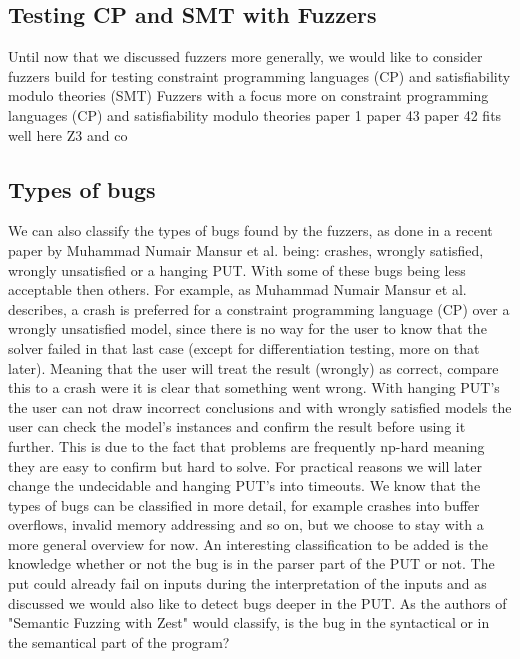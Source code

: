 \subsection{Testing CP and SMT with Fuzzers}
Until now that we discussed fuzzers more generally, we would like to consider fuzzers build for testing constraint programming languages (CP) and satisfiability modulo theories (SMT)
Fuzzers with a focus more on constraint programming languages (CP) and satisfiability modulo theories 
 paper 1
 paper 43 
 paper 42 fits well here
Z3 and co

\subsection{Types of bugs}
\label{cha:2:TypesOfBugs}
We can also classify the types of bugs found by the fuzzers, as done in a recent paper\cite{1mansur2020detecting} by Muhammad Numair Mansur et al. being: crashes, wrongly satisfied, wrongly unsatisfied or a hanging PUT. With some of these bugs being less acceptable then others. For example, as Muhammad Numair Mansur et al. describes, a crash is preferred for a constraint programming language (CP) over a wrongly unsatisfied model, since there is no way for the user to know that the solver failed in that last case (except for differentiation testing, more on that later). Meaning that the user will treat the result (wrongly) as correct, compare this to a crash were it is clear that something went wrong. With hanging PUT's the user can not draw incorrect conclusions and with wrongly satisfied models the user can check the model's instances and confirm the result before using it further. This is due to the fact that problems are frequently np-hard meaning they are easy to confirm but hard to solve. For practical reasons we will later change the undecidable and hanging PUT's into timeouts. We know that the types of bugs can be classified in more detail, for example crashes into buffer overflows, invalid memory addressing and so on, but we choose to stay with a more general overview for now. An interesting classification to be added is the knowledge whether or not the bug is in the parser part of the PUT or not. The put could already fail on inputs during the interpretation of the inputs and as discussed we would also like to detect bugs deeper in the PUT. As the authors of "Semantic Fuzzing with Zest"\cite{22SemanticFuzzing} would classify, is the bug in the syntactical or in the semantical part of the program?

